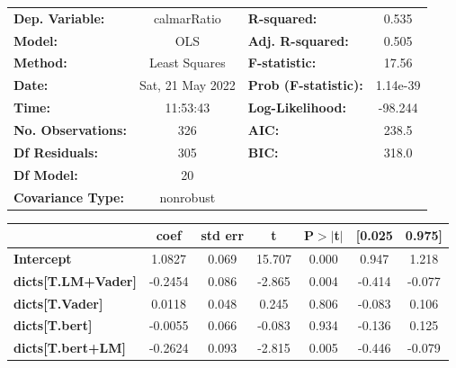 \begin{center}
\begin{tabular}{lclc}
\toprule
\textbf{Dep. Variable:}              &   calmarRatio    & \textbf{  R-squared:         } &     0.535   \\
\textbf{Model:}                      &       OLS        & \textbf{  Adj. R-squared:    } &     0.505   \\
\textbf{Method:}                     &  Least Squares   & \textbf{  F-statistic:       } &     17.56   \\
\textbf{Date:}                       & Sat, 21 May 2022 & \textbf{  Prob (F-statistic):} &  1.14e-39   \\
\textbf{Time:}                       &     11:53:43     & \textbf{  Log-Likelihood:    } &   -98.244   \\
\textbf{No. Observations:}           &         326      & \textbf{  AIC:               } &     238.5   \\
\textbf{Df Residuals:}               &         305      & \textbf{  BIC:               } &     318.0   \\
\textbf{Df Model:}                   &          20      & \textbf{                     } &             \\
\textbf{Covariance Type:}            &    nonrobust     & \textbf{                     } &             \\
\bottomrule
\end{tabular}
\begin{tabular}{lcccccc}
                                     & \textbf{coef} & \textbf{std err} & \textbf{t} & \textbf{P$> |$t$|$} & \textbf{[0.025} & \textbf{0.975]}  \\
\midrule
\textbf{Intercept}                   &       1.0827  &        0.069     &    15.707  &         0.000        &        0.947    &        1.218     \\
\textbf{dicts[T.LM+Vader]}           &      -0.2454  &        0.086     &    -2.865  &         0.004        &       -0.414    &       -0.077     \\
\textbf{dicts[T.Vader]}              &       0.0118  &        0.048     &     0.245  &         0.806        &       -0.083    &        0.106     \\
\textbf{dicts[T.bert]}               &      -0.0055  &        0.066     &    -0.083  &         0.934        &       -0.136    &        0.125     \\
\textbf{dicts[T.bert+LM]}            &      -0.2624  &        0.093     &    -2.815  &         0.005        &       -0.446    &       -0.079     \\

\end{tabular}
\end{center}
